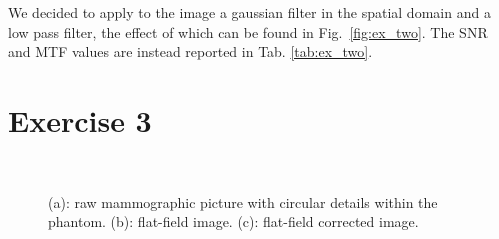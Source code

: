 \documentclass[a4paper]{article}
\begin{document}
We decided to apply to the image a gaussian filter in the spatial domain and a low pass filter, the effect of which can be found in Fig.~\ref{fig:ex_two}. The SNR and MTF values are instead reported in Tab. \ref{tab:ex_two}.



\section*{Exercise 3}

\begin{figure}[H]
	\centering
  \quad
  \\
  \caption{(a): raw mammographic picture with circular details within the phantom. (b): flat-field image. (c): flat-field corrected image.}
  \label{fig:ex_three}
\end{figure}
\end{document}
